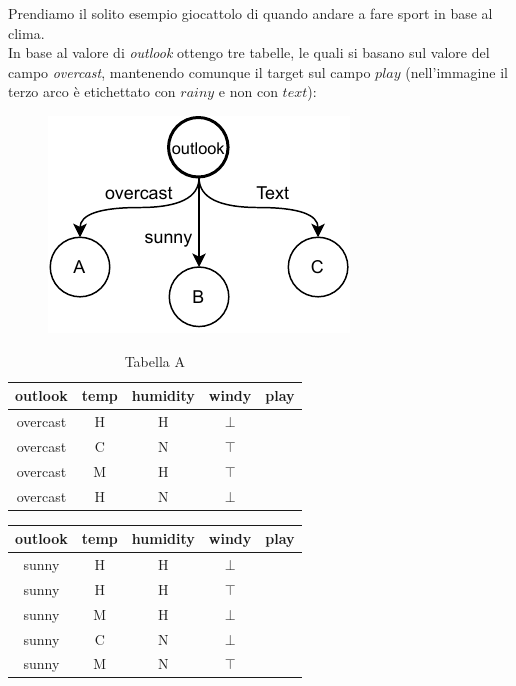 \begin{esempio}
  Prendiamo il solito esempio giocattolo di quando andare a fare sport in base
  al clima.\\
  In base al valore di \textit{outlook} ottengo tre tabelle, le quali si basano sul valore del campo \textit{overcast}, mantenendo comunque il target sul campo $play$ (nell'immagine il terzo arco è etichettato con
  $rainy$ e non con $text$):
  \begin{figure}[H]
    \centering
    \includegraphics[scale = 0.9]{img/dt2.pdf}
  \end{figure}
  \begin{table}[H]
    \centering
    \begin{tabular}{c|c|c|c|c}
      outlook & temp & humidity & windy & play\\
      \hline
      overcast & H & H & $\bot$ & \color{darkgreen}{yes}\\
      overcast & C & N & $\top$ & \color{darkgreen}{yes}\\
      overcast & M & H & $\top$ & \color{darkgreen}{yes}\\
      overcast & H & N & $\bot$ & \color{darkgreen}{yes}
    \end{tabular}
    \caption{Tabella A}
  \end{table}
  \begin{table}[H]
    \centering
    \begin{tabular}{c|c|c|c|c}
      outlook & temp & humidity & windy & play\\
      \hline
      sunny & H & H & $\bot$ & \color{red}{no}\\
      sunny & H & H & $\top$ & \color{red}{no}\\
      sunny & M & H & $\bot$ & \color{red}{no}\\
      sunny & C & N & $\bot$ & \color{darkgreen}{yes}\\
      sunny & M & N & $\top$ & \color{darkgreen}{yes}
    \end{tabular}

\end{table}
\end{esempio}
